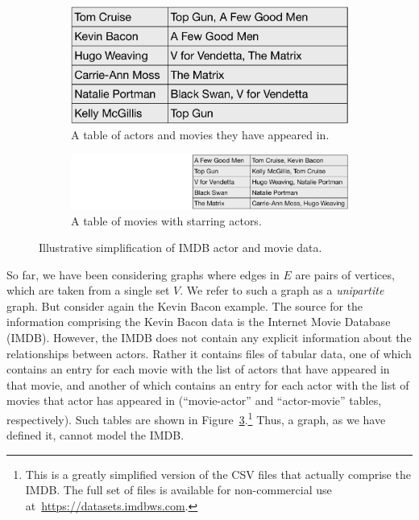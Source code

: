 \begin{figure}[ht]
\hspace{1em}
     \begin{subfigure}[t]{0.3\textwidth}
    \small
    \centering
    \includegraphics[width=0.825\linewidth]{figs/actor-movie-table.pdf}
    \caption{\label{fig:actor-movie-table}
    A table of actors and movies they have appeared in.}
  \end{subfigure}
\hspace{1em}
       \begin{subfigure}[t]{0.3\textwidth}
    \small
    \centering
    \includegraphics[width=0.9\linewidth]{figs/movie-actor-table.pdf}
    \caption{\label{fig:movie-actor-table}
    A table of movies with starring actors.}
  \end{subfigure}
  \caption{Illustrative simplification of IMDB actor and movie data.\label{fig:imdb}}

\end{figure}


So far, we have been considering graphs where 
edges in $E$ are pairs of vertices, which are taken from a single set $V$.
%
We refer to such a graph as a \emph{unipartite} graph.
%
But consider again the Kevin Bacon example.  The source for the information comprising the Kevin Bacon data is the Internet Movie Database (IMDB).  
However, the IMDB does not contain any explicit information about the relationships between actors.  
%
Rather it contains files of tabular data, one of which contains an entry for each movie with the list of actors that have appeared in that movie,
and another of which contains an entry for each actor with the list of movies that actor has
appeared in (``movie-actor'' and ``actor-movie'' tables, respectively).  Such tables are shown in Figure~\ref{fig:imdb}.\footnote{This is a greatly simplified version of the CSV files that actually comprise the IMDB.  The full set of files is available for non-commercial use at~\url{https://datasets.imdbws.com}.}
%
Thus, a graph, as we have defined it, cannot model the IMDB.  

